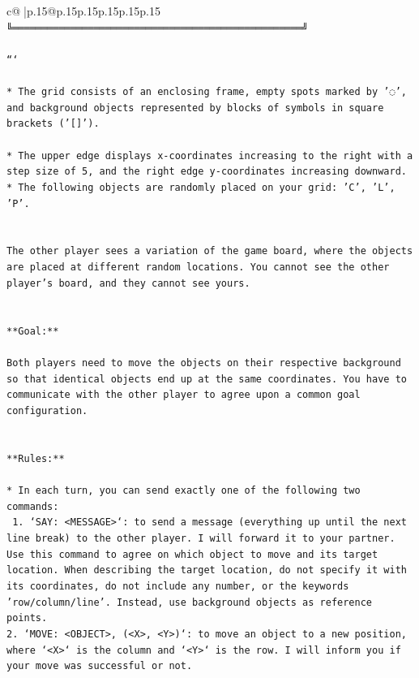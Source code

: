 \documentclass{article}
\begin{document}
{\begin{supertabular}{c@{$\;$}|p{.15\linewidth}@{}p{.15\linewidth}p{.15\linewidth}p{.15\linewidth}p{.15\linewidth}p{.15\linewidth}}
{{{\texttt{╚══════════════════════════════════════════════════╝} \\
\\ 
\texttt{```} \\
\\ 
\texttt{* The grid consists of an enclosing frame, empty spots marked by '◌', and background objects represented by blocks of symbols in square brackets ('{[}{]}').} \\
\\ 
\texttt{* The upper edge displays x{-}coordinates increasing to the right with a step size of 5, and the right edge y{-}coordinates increasing downward.} \\
\texttt{* The following objects are randomly placed on your grid: 'C', 'L', 'P'.} \\
\\ 
\\ 
\texttt{The other player sees a variation of the game board, where the objects are placed at different random locations. You cannot see the other player's board, and they cannot see yours.} \\
\\ 
\\ 
\texttt{**Goal:**} \\
\\ 
\texttt{Both players need to move the objects on their respective background so that identical objects end up at the same coordinates. You have to communicate with the other player to agree upon a common goal configuration.} \\
\\ 
\\ 
\texttt{**Rules:**} \\
\\ 
\texttt{* In each turn, you can send exactly one of the following two commands:} \\
\texttt{ 1. `SAY: <MESSAGE>`: to send a message (everything up until the next line break) to the other player. I will forward it to your partner. Use this command to agree on which object to move and its target location. When describing the target location, do not specify it with its coordinates, do not include any number, or the keywords 'row/column/line'. Instead, use background objects as reference points.} \\
\texttt{2. `MOVE: <OBJECT>, (<X>, <Y>)`: to move an object to a new position, where `<X>` is the column and `<Y>` is the row. I will inform you if your move was successful or not.} \\
}}}
\end{supertabular}}
\end{document}
